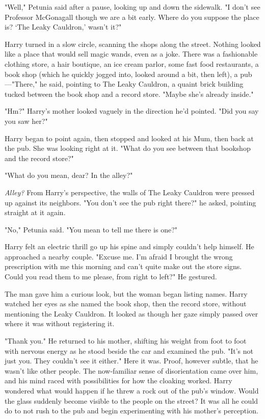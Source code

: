 "Well," Petunia said after a pause, looking up and down
the sidewalk. "I don't see Professor McGonagall{\el} though
we are a bit early. Where do you suppose the place is?
`The Leaky Cauldron,' wasn't it?"

Harry turned in a slow circle, scanning the shops along the
street. Nothing looked like a place that would sell magic
wands, even as a joke. There was a fashionable clothing
store, a hair boutique, an ice cream parlor, some fast food
restaurants, a book shop (which he quickly jogged into,
looked around a bit, then left), a pub—"There," he said,
pointing to The Leaky Cauldron, a quaint brick building
tucked between the book shop and a record store. "Maybe
she's already inside."

"Hm?" Harry's mother looked vaguely in the direction he'd
pointed. "Did you say you saw her?"

Harry began to point again, then stopped and looked at
his Mum, then back at the pub. She was looking right at
it. "What do you see between that bookshop and the
record store?"

"What do you mean, dear? In the alley?"

\emph{Alley?} From Harry's perspective, the walls of The Leaky
Cauldron were pressed up against its neighbors. "You don't
see the pub right there?" he asked, pointing straight at it
again.

"No," Petunia said. "You mean to tell me there is one?"

Harry felt an electric thrill go up his spine and simply
couldn't help himself. He approached a nearby couple.
"Excuse me. I'm afraid I brought
the wrong prescription with me this morning and can't
quite make out the store signs. Could you read them to
me please, from right to left?" He gestured.

The man gave him a curious look, but the woman began
listing names. Harry watched her eyes as she named the
book shop, then the record store, without mentioning the
Leaky Cauldron. It looked as though her gaze simply
passed over where it was without registering it.

"Thank you." He returned to his mother, shifting his weight
from foot to foot with nervous energy as he stood beside
the car and examined the pub. "It's not just you. They
couldn't see it either." Here it was. Proof, however subtle,
that he wasn't like other people. The now-familiar sense of
disorientation came over him, and his mind raced with
possibilities for how the cloaking worked. Harry wondered
what would happen if he threw a rock out of the pub's
window. Would the glass suddenly become visible to the
people on the street? It was all he could do to not rush
to the pub and begin experimenting with his mother's
perception.

